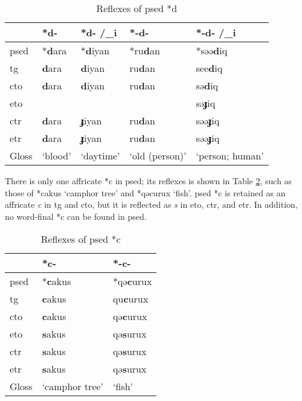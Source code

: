 \begin{table}[!htbp]
\centering
\caption{Reflexes of \acl{psed} *d}
\label{tab:psed_d}
\begin{tabular}{lllll}
\hline
           & *d-     & *d- /\_i  & *-d-           & *-d- /\_i       \\ \hline
\acs{psed} & *\textbf{d}ara   & *\textbf{d}iyan    & *ru\textbf{d}an         & *səə\textbf{d}iq           \\ \hdashline
\acs{tg}   & \textbf{d}ara    & \textbf{d}iyan     & ru\textbf{d}an          & see\textbf{d}iq            \\
\acs{cto}  & \textbf{d}ara    & \textbf{d}iyan     & ru\textbf{d}an          & sə\textbf{d}iq            \\
 \acs{eto}  &         &           &                & sə\textbf{ɟ}iq                \\
\acs{ctr}  & \textbf{d}ara    & \textbf{ɟ}iyan     & ru\textbf{d}an          & səə\textbf{ɟ}iq            \\
\acs{etr}  & \textbf{d}ara    & \textbf{ɟ}iyan     & ru\textbf{d}an          & səə\textbf{ɟ}iq            \\ \hline
Gloss      & `blood' & `daytime' & `old (person)' & `person; human' \\ \hline
\end{tabular}
\end{table}

There is only one affricate *c in \acl{psed}; its reflexes is shown in Table \ref{tab:psed_c}, such as those of *cakus `camphor tree' and *qəcurux `fish'. \acl{psed} *c is retained as an affricate \textit{c} in \acl{tg} and \acl{cto}, but it is reflected as \textit{s} in \acl{eto}, \acl{ctr}, and \acl{etr}. In addition, no word-final *c can be found in \acl{psed}.

\begin{table}[!htbp]
\centering
\caption{Reflexes of \acl{psed} *c}
\label{tab:psed_c}
\begin{tabular}{lll}
\hline
           & *c-       & *-c-   \\ \hline
\acs{psed} & *\textbf{c}akus    & *qə\textbf{c}urux \\ \hdashline
\acs{tg}   & \textbf{c}akus     & qu\textbf{c}urux  \\
\acs{cto}  & \textbf{c}akus     & qə\textbf{c}urux  \\
\acs{eto}  & \textbf{s}akus     & qə\textbf{s}urux       \\
\acs{ctr}  & \textbf{s}akus     & qə\textbf{s}urux  \\
\acs{etr}  & \textbf{s}akus     & qə\textbf{s}urux  \\ \hline
Gloss      & `camphor tree' & `fish' \\ \hline
\end{tabular}
\end{table}

